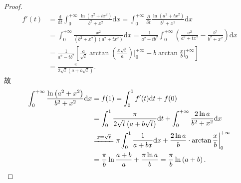 \documentclass[../../main.tex]{subfiles}%
\begin{document}
\begin{proof}
\begin{align*}
f'(t)&=\frac{\mathrm{d}}{\mathrm{d}t}\int_0^{+\infty}\frac{\ln \left( a^2+tx^2 \right)}{b^2+x^2}\mathrm{d}x=\int_0^{+\infty}\frac{\partial}{\partial t}\frac{\ln \left( a^2+tx^2 \right)}{b^2+x^2}\mathrm{d}x\\
&=\int_0^{+\infty}\frac{x^2}{\left( b^2+x^2 \right) \left( a^2+tx^2 \right)}\mathrm{d}x
=\frac{1}{a^2-tb^2}\int_0^{+\infty}\left( \frac{a^2}{a^2+tx^2}-\frac{b^2}{b^2+x^2} \right) \mathrm{d}x\\
&=\frac{1}{a^2-tb^2}\left[ \frac{a}{\sqrt{t}}\arctan \left( \frac{x\sqrt{t}}{a} \right) \bigg|_{0}^{+\infty}-b\arctan \frac{x}{b}\bigg|_{0}^{+\infty} \right] \\
&=\frac{\pi}{2\sqrt{t}\left( a+b\sqrt{t} \right)}.
\end{align*}
故
\begin{align*}
\int_0^{+\infty}\frac{\ln \left( a^2+x^2 \right)}{b^2+x^2}\mathrm{d}x&=f(1)=\int_0^1f'(t)\mathrm{d}t+f(0)\\
&=\int_0^1\frac{\pi}{2\sqrt{t}\left( a+b\sqrt{t} \right)}\mathrm{d}t+\int_0^{+\infty}\frac{2\ln a}{b^2+x^2}\mathrm{d}x\\
&\xlongequal{x=\sqrt{t}}\pi \int_0^1\frac{1}{a+bx}\mathrm{d}x+\frac{2\ln a}{b}\cdot \arctan \frac{x}{b}\bigg|_{0}^{+\infty}\\
&=\frac{\pi}{b}\ln \frac{a+b}{a}+\frac{\pi \ln a}{b}=\frac{\pi}{b}\ln \left( a+b \right).
\end{align*}
\end{proof}
\end{document}
